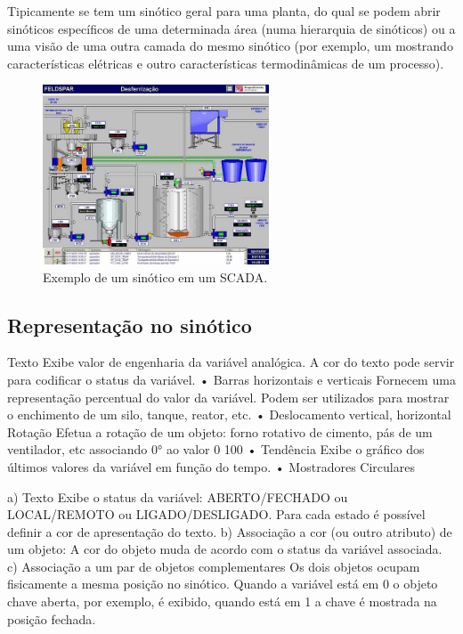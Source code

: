 Tipicamente se tem um sinótico geral para uma planta, do qual se podem abrir sinóticos específicos de uma determinada área (numa hierarquia de sinóticos) ou a uma visão de uma outra camada do mesmo sinótico (por exemplo, um mostrando características elétricas e outro características termodinâmicas de um processo).

\begin{figure}[hb]
  \centering
  \includegraphics[width=0.6\textwidth]{figuras/sinotico_feldspar}
  \caption{Exemplo de um sinótico em um SCADA.}\label{fig:sinotico_feldspar}
\end{figure}


\subsection{Representação no sinótico}
\label{sub:Representação no sinótico}
Texto
Exibe valor de engenharia da variável analógica. A cor do texto pode servir
para codificar o status da variável.
• Barras horizontais e verticais
Fornecem uma representação percentual do valor da variável. Podem ser
utilizados para mostrar o enchimento de um silo, tanque, reator, etc.
• Deslocamento vertical, horizontal
Rotação
Efetua a rotação de um objeto: forno rotativo de cimento, pás de um
ventilador, etc associando 0° ao valor 0%
100%
• Tendência
Exibe o gráfico dos últimos valores da variável em função do tempo.
• Mostradores Circulares

a) Texto
Exibe o status da variável: ABERTO/FECHADO ou LOCAL/REMOTO ou
LIGADO/DESLIGADO. Para cada estado é possível definir a cor de
apresentação do texto.
b) Associação a cor (ou outro atributo) de um objeto:
A cor do objeto muda de acordo com o status da variável associada.
c) Associação a um par de objetos complementares
Os dois objetos ocupam fisicamente a mesma posição no sinótico. Quando
a variável está em 0 o objeto chave aberta, por exemplo, é exibido, quando
está em 1 a chave é mostrada na posição fechada.

